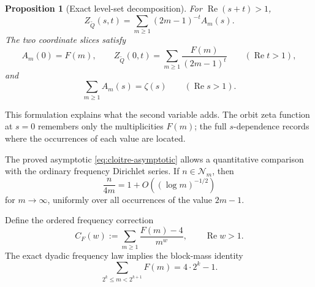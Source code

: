 \documentclass[11pt]{article}
\newtheorem{proposition}[theorem]{Proposition}
\theoremstyle{definition}
\theoremstyle{remark}
\newcommand{\Qp}{\widetilde Q}
\newcommand{\RePart}{\operatorname{Re}}
\begin{document}
\begin{proposition}[Exact level-set decomposition]
\label{prop:level-decomp}
For \(\RePart(s+t)>1\),
\begin{equation}
{
Z_{\Qp}(s,t)
=\sum_{m\ge1}(2m-1)^{-t}A_m(s).
}
\label{eq:level-decomp}
\end{equation}
The two coordinate slices satisfy
\begin{equation}
A_m(0)=F(m),
\qquad
Z_{\Qp}(0,t)=\sum_{m\ge1}\frac{F(m)}{(2m-1)^t}
\qquad(\RePart t>1),
\label{eq:orbit-slice}
\end{equation}
and
\begin{equation}
\sum_{m\ge1}A_m(s)=\zeta(s)
\qquad(\RePart s>1).
\label{eq:index-slice}
\end{equation}
\end{proposition}

This formulation explains what the second variable adds.  The orbit zeta function at \(s=0\) remembers only the multiplicities \(F(m)\); the full \(s\)-dependence records where the occurrences of each value are located.

The proved asymptotic \eqref{eq:cloitre-asymptotic} allows a quantitative comparison with the ordinary frequency Dirichlet series.  If \(n\in\mathcal N_m\), then
\begin{equation}
\frac{n}{4m}=1+O\!\left((\log m)^{-1/2}\right)
\label{eq:occurrence-location}
\end{equation}
for \(m\to\infty\), uniformly over all occurrences of the value \(2m-1\).

Define the ordered frequency correction
\begin{equation}
C_F(w):=\sum_{m\ge1}\frac{F(m)-4}{m^w},
\qquad \RePart w>1.
\label{eq:CF}
\end{equation}
The exact dyadic frequency law implies the block-mass identity
\begin{equation}
\sum_{2^k\le m<2^{k+1}}F(m)=4\cdot2^k-1.
\label{eq:block-frequency-mass}
\end{equation}
\end{document}
